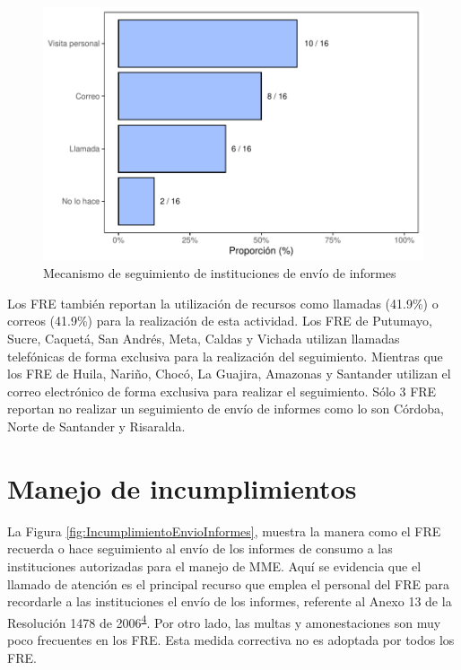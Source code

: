 \documentclass[
]{book}
\begin{document}
\begin{figure}

{\centering \includegraphics[width=0.85\linewidth]{InformeFinal_files/figure-latex/SeguimientoEnvioInformes-1} 

}

\caption{Mecanismo de seguimiento de instituciones de envío de informes}\label{fig:SeguimientoEnvioInformes}
\end{figure}

Los FRE también reportan la utilización de recursos como llamadas (41.9\%) o correos (41.9\%) para la realización de esta actividad. Los FRE de Putumayo, Sucre, Caquetá, San Andrés, Meta, Caldas y Vichada utilizan llamadas telefónicas de forma exclusiva para la realización del seguimiento. Mientras que los FRE de Huila, Nariño, Chocó, La Guajira, Amazonas y Santander utilizan el correo electrónico de forma exclusiva para realizar el seguimiento. Sólo 3 FRE reportan no realizar un seguimiento de envío de informes como lo son Córdoba, Norte de Santander y Risaralda.

\hypertarget{manejo-de-incumplimientos}{%
\section{Manejo de incumplimientos}\label{manejo-de-incumplimientos}}

La Figura \ref{fig:IncumplimientoEnvioInformes}, muestra la manera como el FRE recuerda o hace seguimiento al envío de los informes de consumo a las instituciones autorizadas para el manejo de MME. Aquí se evidencia que el llamado de atención es el principal recurso que emplea el personal del FRE para recordarle a las instituciones el envío de los informes, referente al Anexo 13 de la Resolución 1478 de 2006\textsuperscript{\protect\hyperlink{ref-MSPS1478-2006}{4}}. Por otro lado, las multas y amonestaciones son muy poco frecuentes en los FRE. Esta medida correctiva no es adoptada por todos los FRE.
\end{document}
